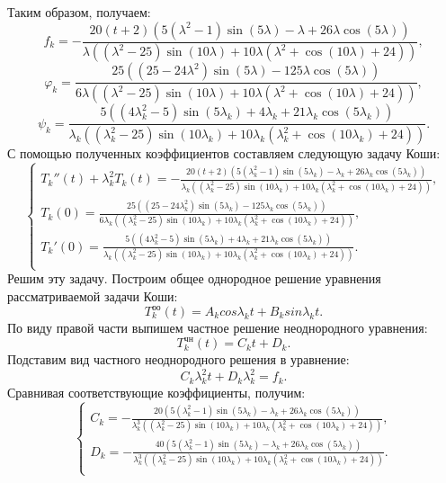 \documentclass[11pt]{article}
\begin{document}
Таким образом, получаем: $$f_k=-\frac{20 (t+2) \left(5 \left(\lambda ^2-1\right) \sin (5 \lambda )-\lambda +26 \lambda  \cos (5 \lambda )\right)}{\lambda  \left(\left(\lambda ^2-25\right) \sin (10 \lambda )+10 \lambda  \left(\lambda ^2+\cos (10 \lambda )+24\right)\right)},$$
$$\varphi_k = \frac{25 \left(\left(25-24 \lambda ^2\right) \sin (5 \lambda )-125 \lambda  \cos (5 \lambda )\right)}{6 \lambda  \left(\left(\lambda ^2-25\right) \sin (10 \lambda )+10 \lambda  \left(\lambda ^2+\cos (10 \lambda )+24\right)\right)},$$
$$\psi_k = \frac{5 \left(\left(4 \lambda_k ^2-5\right) \sin (5 \lambda_k )+4 \lambda_k +21 \lambda_k  \cos (5 \lambda_k )\right)}{\lambda_k  \left(\left(\lambda_k ^2-25\right) \sin (10 \lambda_k )+10 \lambda_k  \left(\lambda_k ^2+\cos (10 \lambda_k )+24\right)\right)}.$$
С помощью полученных коэффициентов составляем следующую задачу Коши:
$$\begin{cases}
    T_k''(t)+\lambda_k^2 T_k(t)=-\frac{20 (t+2) \left(5 \left(\lambda_k ^2-1\right) \sin (5 \lambda_k )-\lambda_k +26 \lambda_k  \cos (5 \lambda_k )\right)}{\lambda_k  \left(\left(\lambda_k ^2-25\right) \sin (10 \lambda_k )+10 \lambda_k  \left(\lambda_k ^2+\cos (10 \lambda_k )+24\right)\right)},\\
    T_k(0)=\frac{25 \left(\left(25-24 \lambda_k ^2\right) \sin (5 \lambda_k )-125 \lambda_k  \cos (5 \lambda_k )\right)}{6 \lambda_k  \left(\left(\lambda_k ^2-25\right) \sin (10 \lambda_k )+10 \lambda_k  \left(\lambda_k ^2+\cos (10 \lambda_k )+24\right)\right)},\\
    T_k'(0)=\frac{5 \left(\left(4 \lambda_k ^2-5\right) \sin (5 \lambda_k )+4 \lambda_k +21 \lambda_k  \cos (5 \lambda_k )\right)}{\lambda_k  \left(\left(\lambda_k ^2-25\right) \sin (10 \lambda_k )+10 \lambda_k  \left(\lambda_k ^2+\cos (10 \lambda_k )+24\right)\right)}.\\
\end{cases}$$
Решим эту задачу. Построим общее однородное решение уравнения рассматриваемой задачи Коши:
$$T_k^{\text{оо}}(t)=A_kcos\lambda_kt+B_ksin\lambda_kt.$$
По виду правой части выпишем частное решение неоднородного уравнения:
$$T_k^{\text{чн}}(t)=C_kt+D_k.$$
Подставим вид частного неоднородного решения в уравнение:
$$C_k \lambda_k^2 t+D_k\lambda_k^2=f_k.$$
Сравнивая соответствующие коэффициенты, получим:
$$\begin{cases}
    C_k = -\frac{20 \left(5 \left(\lambda_k ^2-1\right) \sin (5 \lambda_k )-\lambda_k +26 \lambda_k  \cos (5 \lambda_k )\right)}{\lambda_k^3  \left(\left(\lambda_k ^2-25\right) \sin (10 \lambda_k )+10 \lambda_k  \left(\lambda_k ^2+\cos (10 \lambda_k )+24\right)\right)}, \\
    D_k = -\frac{40\left(5 \left(\lambda_k ^2-1\right) \sin (5 \lambda_k )-\lambda_k +26 \lambda_k  \cos (5 \lambda_k )\right)}{\lambda_k^3  \left(\left(\lambda_k ^2-25\right) \sin (10 \lambda_k )+10 \lambda_k  \left(\lambda_k ^2+\cos (10 \lambda_k )+24\right)\right)}.\\
\end{cases}$$
\end{document}
